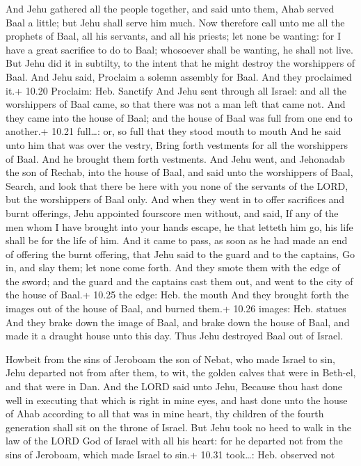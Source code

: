  And Jehu gathered all the people together, and said unto
them, Ahab served Baal a little; but Jehu shall serve him much.
 Now therefore call unto me all the prophets of Baal, all
his servants, and all his priests; let none be wanting: for I have a
great sacrifice to do to Baal; whosoever shall be wanting, he shall not
live. But Jehu did it in subtilty, to the intent that he might destroy
the worshippers of Baal.  And Jehu said, Proclaim a solemn
assembly for Baal. And they proclaimed it.+ 10.20 Proclaim: Heb.
Sanctify  And Jehu sent through all Israel: and all the
worshippers of Baal came, so that there was not a man left that came
not. And they came into the house of Baal; and the house of Baal was
full from one end to another.+ 10.21 full\ldots: or, so full that they
stood mouth to mouth  And he said unto him that was over
the vestry, Bring forth vestments for all the worshippers of Baal. And
he brought them forth vestments.  And Jehu went, and
Jehonadab the son of Rechab, into the house of Baal, and said unto the
worshippers of Baal, Search, and look that there be here with you none
of the servants of the LORD, but the worshippers of Baal only.
 And when they went in to offer sacrifices and burnt
offerings, Jehu appointed fourscore men without, and said, If any of the
men whom I have brought into your hands escape, he that letteth him go,
his life shall be for the life of him.  And it came to
pass, as soon as he had made an end of offering the burnt offering, that
Jehu said to the guard and to the captains, Go in, and slay them; let
none come forth. And they smote them with the edge of the sword; and the
guard and the captains cast them out, and went to the city of the house
of Baal.+ 10.25 the edge: Heb. the mouth  And they brought
forth the images out of the house of Baal, and burned them.+ 10.26
images: Heb. statues  And they brake down the image of
Baal, and brake down the house of Baal, and made it a draught house unto
this day.  Thus Jehu destroyed Baal out of Israel.

 Howbeit from the sins of Jeroboam the son of Nebat, who
made Israel to sin, Jehu departed not from after them, to wit, the
golden calves that were in Beth-el, and that were in Dan. 
And the LORD said unto Jehu, Because thou hast done well in executing
that which is right in mine eyes, and hast done unto the house of Ahab
according to all that was in mine heart, thy children of the fourth
generation shall sit on the throne of Israel.  But Jehu
took no heed to walk in the law of the LORD God of Israel with all his
heart: for he departed not from the sins of Jeroboam, which made Israel
to sin.+ 10.31 took\ldots: Heb. observed not

